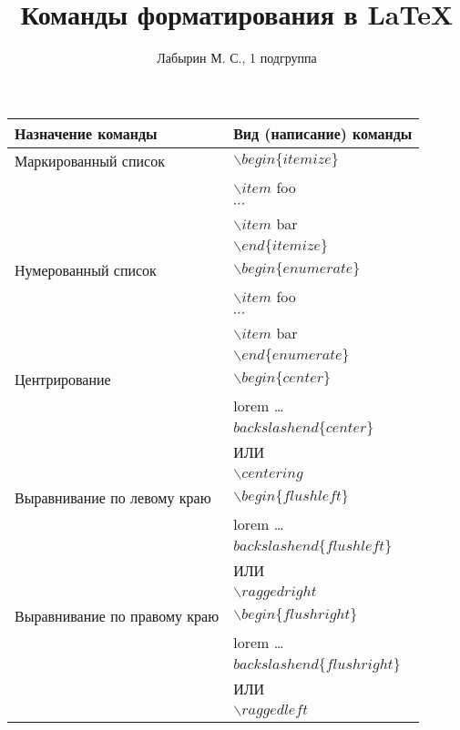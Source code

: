\documentclass[12pt]{article}
\author{Лабырин М. С., 1 подгруппа}
\title{Команды форматирования в \LaTeX}
\begin{document}
\maketitle

\begin{center}
  \begin{tabular}{ || l | l || }

    \hline
    Назначение команды & Вид (написание) команды \\ \hline
    \hline

    Маркированный список &
    $\backslash begin\{itemize\}$ \\ &
    $\backslash item$ foo \\ &
    $\cdots$ \\ &
    $\backslash item$ bar \\ &
    $\backslash end\{itemize\}$ \\ \hline

    Нумерованный список &
    $\backslash begin\{enumerate\}$ \\ &
    $\backslash item$ foo \\ &
    $\cdots$ \\ &
    $\backslash item$ bar \\ & 
    $\backslash end\{enumerate\}$ \\ \hline

    Центрирование &
    $\backslash begin\{center\}$ \\ &
    lorem \ldots \\ &
    $backslash end\{center\}$ \\ &
    ИЛИ \\ &
    $\backslash centering$ \\ \hline

    Выравнивание по левому краю &
    $\backslash begin\{flushleft\}$ \\ &
    lorem \ldots \\ &
    $backslash end\{flushleft\}$ \\ &
    ИЛИ \\ &
    $\backslash raggedright$ \\ \hline

    Выравнивание по правому краю &
    $\backslash begin\{flushright\}$ \\ &
    lorem \ldots \\ &
    $backslash end\{flushright\}$ \\ &
    ИЛИ \\ &
    $\backslash raggedleft$ \\ \hline


\end{tabular}
\end{center}
\end{document}
